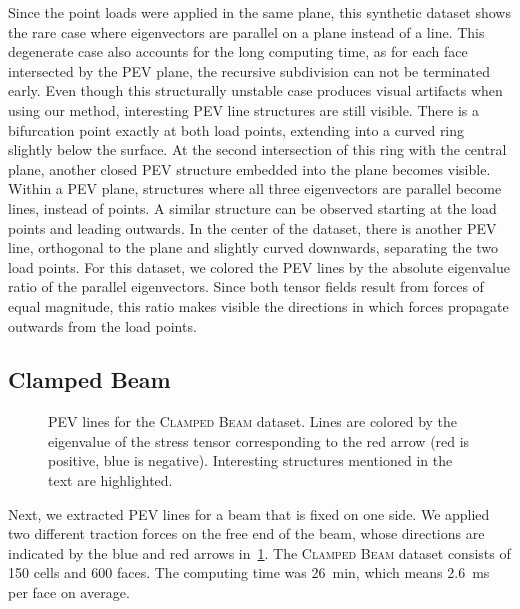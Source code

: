 %
Since the point loads were applied in the same plane, this synthetic dataset
shows the rare case where eigenvectors are parallel on a plane instead of a
line.
%
This degenerate case also accounts for the long computing time, as for each face
intersected by the \ac{PEV} plane, the recursive subdivision can not be
terminated early.
%
Even though this structurally unstable case produces visual artifacts when
using our method, interesting \ac{PEV} line structures are still visible.
%
There is a bifurcation point exactly at both load points, extending into a
curved ring slightly below the surface.
%
At the second intersection of this ring with the central plane, another closed
\ac{PEV} structure embedded into the plane becomes visible.
%
Within a \ac{PEV} plane, structures where all three eigenvectors are parallel
become lines, instead of points.
%
A similar structure can be observed starting at the load points and leading
outwards.
%
In the center of the dataset, there is another \ac{PEV} line, orthogonal to the
plane and slightly curved downwards, separating the two load points.
%
For this dataset, we colored the \ac{PEV} lines by the absolute eigenvalue ratio
of the parallel eigenvectors.
%
Since both tensor fields result from forces of equal magnitude, this ratio makes
visible the directions in which forces propagate outwards from the load points.
%
%
\subsection{Clamped Beam} %
\label{ssub:clamped_beam}
%
\begin{figure}[t]
    \setlength\figurewidth\textwidth
    \centering
    
    \caption{\ac{PEV} lines for the \textsc{Clamped Beam} dataset. Lines are
             colored by the eigenvalue of the stress tensor corresponding to the
             red arrow (red is positive, blue is negative). Interesting
             structures mentioned in the text are highlighted.}
    \label{fig:beam_full}
\end{figure}
%
Next, we extracted \ac{PEV} lines for a beam that is fixed on one side.
%
We applied two different traction forces on the free end of the beam, whose
directions are indicated by the blue and red arrows in~\cref{fig:beam_full}.
%
The \textsc{Clamped Beam} dataset consists of \num{150}\si{\kilo} cells and
\num{600}\si{\kilo} faces.
%
The computing time was \SI{26}{\minute}, which means \SI{2.6}{\milli\second}
per face on average.
%

